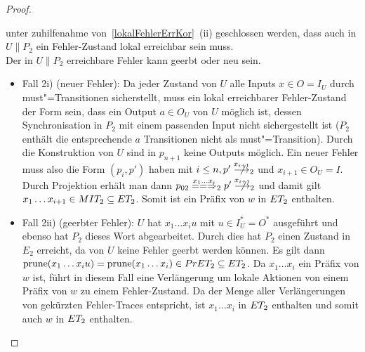\begin{proof}
\begin{itemize}
      unter zuhilfenahme von~\ref{lokalFehlerErrKor}~(ii) geschlossen werden,
      dass auch in $U\|P_2$ ein Fehler-Zustand lokal erreichbar sein muss.\\
      Der in $U\|P_2$ erreichbare Fehler kann geerbt oder neu sein.
      \begin{itemize}
        \item Fall 2i) (neuer Fehler): Da jeder Zustand von $U$ alle Inputs
          $x\in O=I_U$ durch must"=Transitionen sicherstellt, muss ein lokal
          erreichbarer Fehler-Zustand der Form sein, dass ein Output $a\in O_U$
          von $U$ möglich ist, dessen Synchronisation in $P_2$ mit einem
          passenden Input nicht sichergestellt ist ($P_2$ enthält die
          entsprechende $a$ Transitionen nicht als must"=Transition). Durch die
          Konstruktion von $U$ sind in $p_{n+1}$ keine Outputs möglich. Ein
          neuer Fehler muss also die Form $(p_i,p')$ haben mit $i\leq
          n, p'\nmust[x_{i+1}]_2$ und $x_{i+1}\in O_U=I$. Durch Projektion
          erhält man dann $p_{02}\lweakmay[x_1\dots x_i]_2p'\nmust[x_{i+1}]_2$
          und damit gilt $x_1\dots x_{i+1}\in MIT _2\subseteq ET _2$. Somit
          ist ein Präfix von $w$ in $ET _2$ enthalten.
        \item Fall 2ii) (geerbter Fehler): $U$ hat $x_1\dots x_iu$ mit $u\in
          I_U^*=O^*$ ausgeführt und ebenso hat $P_2$ dieses Wort abgearbeitet.
          Durch dies hat $P_2$ einen Zustand  in $E_2$ erreicht, da von $U$
          keine Fehler geerbt werden können. Es gilt dann $\mathrm{prune} (x_1\dots
          x_iu) = \mathrm{prune} (x_1\dots x_i)\in PrET _2\subseteq ET _2$. Da
          $x_1\dots x_i$ ein Präfix von $w$ ist, führt in diesem Fall eine
          Verlängerung um lokale Aktionen von einem Präfix von $w$ zu einem
          Fehler-Zustand. Da \ET{} der Menge aller Verlängerungen von gekürzten
          Fehler-Traces entspricht, ist $x_1\dots x_i$ in $ET
          _2$ enthalten und somit auch $w$ in $ET _2$ enthalten.
      \end{itemize}
  \end{itemize}


\end{proof}
